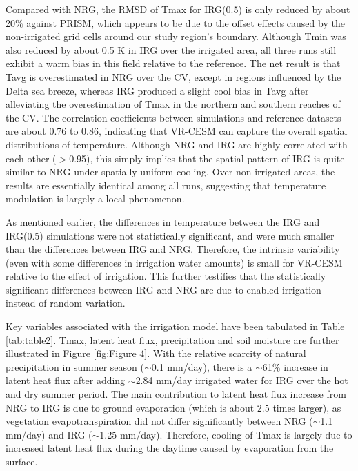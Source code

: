 
Compared with NRG, the RMSD of Tmax for IRG(0.5) is only reduced by about 20$\%$ against PRISM, which appears to be due to the offset effects caused by the non-irrigated grid cells around our study region's boundary. Although Tmin was also reduced by about 0.5 K in IRG over the irrigated area, all three runs still exhibit a warm bias in this field relative to the reference. The net result is that Tavg is overestimated in NRG over the CV, except in regions influenced by the Delta sea breeze, whereas IRG produced a slight cool bias in Tavg after alleviating the overestimation of Tmax in the northern and southern reaches of the CV. The correlation coefficients between simulations and reference datasets are about 0.76 to 0.86, indicating that VR-CESM can capture the overall spatial distributions of temperature. Although NRG and IRG are highly correlated with each other ($>$0.95), this simply implies that the spatial pattern of IRG is quite similar to NRG under spatially uniform cooling. Over non-irrigated areas, the results are essentially identical among all runs, suggesting that temperature modulation is largely a local phenomenon.

As mentioned earlier, the differences {in temperature} between the IRG and IRG(0.5) simulations were not statistically significant, and were much smaller than the differences between IRG and NRG. Therefore, the intrinsic variability (even with some differences in irrigation water amounts) is small for VR-CESM relative to the effect of irrigation. This further testifies that the statistically significant differences between IRG and NRG are due to enabled irrigation instead of random variation.


Key variables associated with the irrigation model have been tabulated in Table \ref{tab:table2}. Tmax, latent heat flux, precipitation and soil moisture are further illustrated in Figure \ref{fig:Figure 4}. With the relative scarcity of natural precipitation in summer season ($\sim$0.1 mm/day), there is a $\sim$61\% increase in latent heat flux after adding $\sim$2.84 mm/day irrigated water for IRG over the hot and dry summer period. The main contribution to latent heat flux increase from NRG to IRG is due to ground evaporation (which is about 2.5 times larger), as vegetation evapotranspiration did not differ significantly between NRG ($\sim$1.1 mm/day) and IRG ($\sim$1.25 mm/day). Therefore, cooling of Tmax is largely due to increased latent heat flux during the daytime caused by evaporation from the surface.

